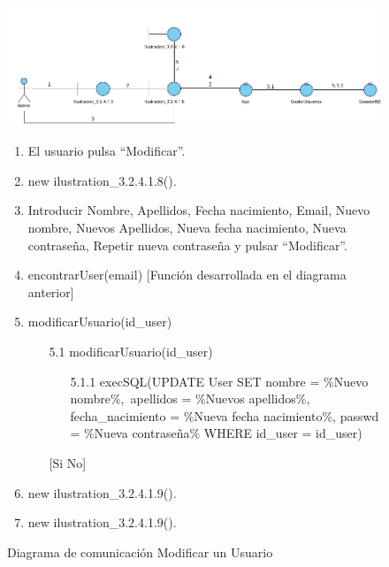 ﻿\documentclass{report}
\begin{document}
            \begin{figure}[H]
                \centering
                \includegraphics[width=1.1\textwidth]{img/comunicacion/diagrama7.png}
                \caption{Diagrama de comunicación Modificar un Usuario}
            \clearpage
            \begin{enumerate}
                \item El usuario pulsa ``Modificar''.
                \item new ilustration\_3.2.4.1.8().
                \item Introducir Nombre, Apellidos, Fecha nacimiento, Email, Nuevo nombre, Nuevos Apellidos, Nueva fecha nacimiento, Nueva contraseña, Repetir nueva contraseña y pulsar ``Modificar''.
                \item encontrarUser(email) [Función desarrollada en el diagrama anterior]
                \newline
                [SI usuarioBuscado != NULL]
                \newline
                [SI \%Nueva contraseña\% == \%Repetir nueva contraseña\%]
                \item modificarUsuario(id\_user)
                \begin{enumerate}
                    \item[5.1] modificarUsuario(id\_user)
                        \begin{enumerate}
                            \item[5.1.1] execSQL(UPDATE User SET nombre = \%Nuevo nombre\%,\ apellidos = \%Nuevos apellidos\%, fecha\_nacimiento = \%Nueva fecha nacimiento\%, passwd = \%Nueva contraseña\% WHERE id\_user = id\_user)
                        \end{enumerate}
                    [Si No]
                \end{enumerate}
                \item new ilustration\_3.2.4.1.9().
                \newline
                [Si No]
                \item new ilustration\_3.2.4.1.9().
            \end{enumerate}
            \end{figure}
            \clearpage
\end{document}
